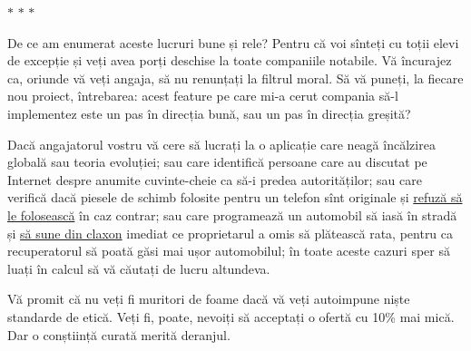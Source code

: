 \begin{center}
  $\ast$ \quad $\ast$ \quad $\ast$
\end{center}

De ce am enumerat aceste lucruri bune și rele? Pentru că voi sînteți cu toții elevi de excepție și veți avea porți deschise la toate companiile notabile. Vă încurajez ca, oriunde vă veți angaja, să nu renunțați la filtrul moral. Să vă puneți, la fiecare nou proiect, întrebarea: acest feature pe care mi-a cerut compania să-l implementez este un pas în direcția bună, sau un pas în direcția greșită?

Dacă angajatorul vostru vă cere să lucrați la o aplicație care neagă încălzirea globală sau teoria evoluției; sau care identifică persoane care au discutat pe Internet despre anumite cuvinte-cheie ca să-i predea autorităților; sau care verifică dacă piesele de schimb folosite pentru un telefon sînt originale și \href{https://www.wired.com/story/apple-iphone-parts-pairing-right-to-repair/}{refuză să le folosească} în caz contrar; sau care programează un automobil să iasă în stradă și \href{https://news.ycombinator.com/item?id=29623658}{să sune din claxon} imediat ce proprietarul a omis să plătească rata, pentru ca recuperatorul să poată găsi mai ușor automobilul; în toate aceste cazuri sper să luați în calcul să vă căutați de lucru altundeva.

Vă promit că nu veți fi muritori de foame dacă vă veți autoimpune niște standarde de etică. Veți fi, poate, nevoiți să acceptați o ofertă cu 10\% mai mică. Dar o conștiință curată merită deranjul. 
